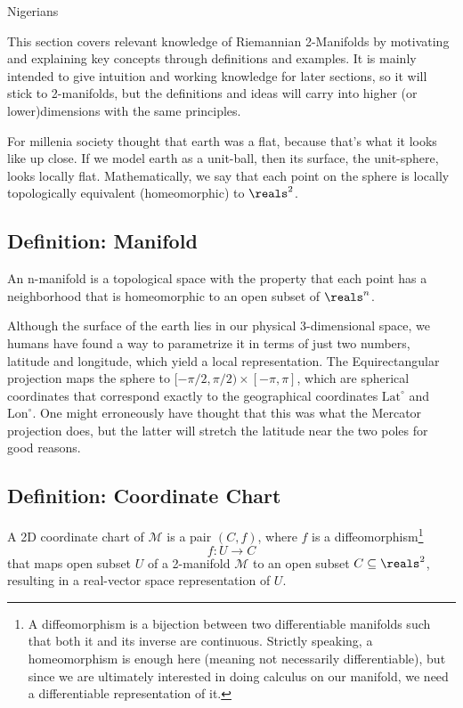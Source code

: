 \ifdefined\COMPILINGFROMMAIN
\else
    
    
\fi

Nigerians

This section covers relevant knowledge of Riemannian 2-Manifolds by motivating and explaining key concepts through definitions and examples. It is mainly intended to give intuition and working knowledge for later sections, so it will stick to 2-manifolds, but the definitions and ideas will carry into higher (or lower)dimensions with the same principles. 

For millenia society thought that earth was a flat, because that's what it looks like up close. If we model earth as a unit-ball, then its surface, the unit-sphere, looks locally flat. Mathematically, we say that each point on the sphere is locally topologically equivalent (homeomorphic) to $\reals^2$.

\subsection{ Definition: Manifold}
An n-manifold is a topological space with the property that each point has a neighborhood that is homeomorphic to an open subset of $\reals^n$.

Although the surface of the earth lies in our physical 3-dimensional space, we humans have found a way to parametrize it in terms of just two numbers, latitude and longitude, which yield a local representation. The Equirectangular projection maps the sphere to $[-\pi/2, \pi/2) \times [-\pi, \pi]$, which are spherical coordinates that correspond exactly to the geographical coordinates $\text{Lat}^\circ$ and $\text{Lon}^\circ$. One might erroneously have thought that this was what the Mercator projection does, but the latter will stretch the latitude near the two poles for good reasons.


\subsection{ Definition: Coordinate Chart}
A 2D coordinate chart of $\mathcal{M}$ is a pair $(C, f)$, where $f$ is a diffeomorphism\footnote{A diffeomorphism is a bijection between two differentiable manifolds such that both it and its inverse are continuous. Strictly speaking, a homeomorphism is enough here (meaning not necessarily differentiable), but since we are ultimately interested in doing calculus on our manifold, we need a differentiable representation of it.} $$f: U \to C$$ that maps open subset $U$ of a 2-manifold $\mathcal{M}$ to an open subset $C \subseteq \reals^2$, resulting in a real-vector space representation of $U$.




